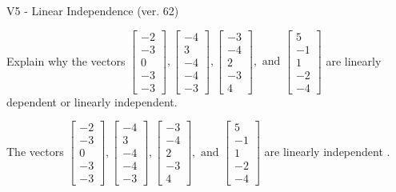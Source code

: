 \begin{exercise}
  \begin{exerciseTitle}V5 - Linear Independence (ver. 62)\end{exerciseTitle}
  \begin{exerciseStatement}
    Explain why the vectors \(\left[\begin{array}{r}
-2 \\
-3 \\
0 \\
-3 \\
-3
\end{array}\right] , \left[\begin{array}{r}
-4 \\
3 \\
-4 \\
-4 \\
-3
\end{array}\right] , \left[\begin{array}{r}
-3 \\
-4 \\
2 \\
-3 \\
4
\end{array}\right] , \text{ and } \left[\begin{array}{r}
5 \\
-1 \\
1 \\
-2 \\
-4
\end{array}\right]\) are linearly dependent or linearly independent.	


  \end{exerciseStatement}
  \begin{exerciseAnswer}
   The vectors \(\left[\begin{array}{r}
-2 \\
-3 \\
0 \\
-3 \\
-3
\end{array}\right] , \left[\begin{array}{r}
-4 \\
3 \\
-4 \\
-4 \\
-3
\end{array}\right] , \left[\begin{array}{r}
-3 \\
-4 \\
2 \\
-3 \\
4
\end{array}\right] , \text{ and } \left[\begin{array}{r}
5 \\
-1 \\
1 \\
-2 \\
-4
\end{array}\right]\) are 
  	 linearly independent  .
  


  \end{exerciseAnswer}
\end{exercise}